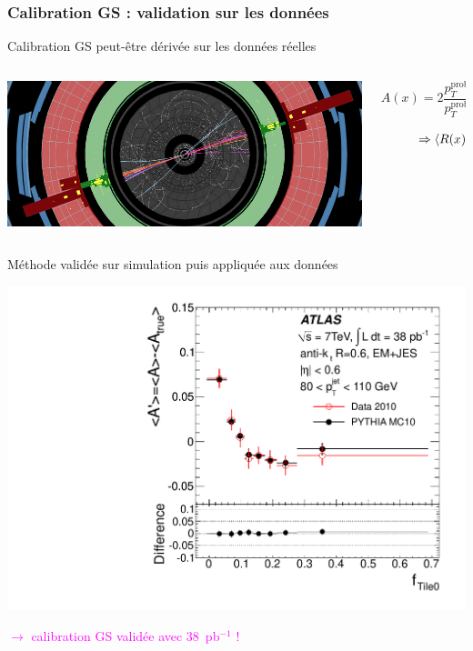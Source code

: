 \begin{frame}
\frametitle{Calibration GS : validation sur les données}
\vspace*{-0.2cm}
\begin{maliste}
\item Calibration GS peut-\^etre d\'eriv\'ee sur les donn\'ees r\'eelles

\vspace*{0.3cm}
\begin{columns}
\begin{column}{0.5\textwidth}
\includegraphics[width=1\textwidth]{Figures/JES/DijetsEventDisplay.png}
\end{column}
\begin{column}{0.5\textwidth}
\[A(x)=2\frac{p_T^\text{probe}(x)-p_T^\text{ref}}{p_T^\text{probe}(x)+p_T^\text{ref}}\]
\vspace*{-0.1cm}
\[
\hspace*{1cm}
\Rightarrow
\left<R(x)\right>\simeq\frac{2+\left<A(x)\right>}{2-\left<A(x)\right)}
\]
\end{column}
\end{columns}
\vspace*{0.2cm}
\item M\'ethode valid\'ee sur simulation puis appliqu\'ee aux donn\'ees
\vspace*{-0.1cm}
\end{maliste}
\begin{center}
\includegraphics[width=.4\textwidth]{Figures/JES/fig_49c.pdf}
\end{center}
\vspace*{-0.35cm}
\begin{center}
\textcolor{magenta}{$\rightarrow$ calibration GS valid\'ee avec 38~pb$^{-1}$ !}
\end{center}
\end{frame}


